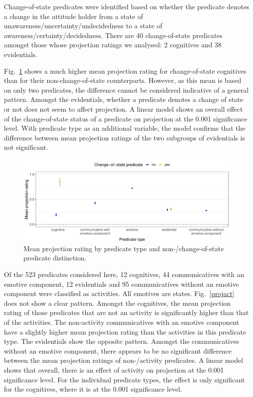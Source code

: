 \documentclass[11pt,fleqn]{article}
\newcommand{\figref}[1]{Fig.~\ref{#1}}
\newcommand{\6}{\mbox{$[\hspace*{-.6mm}[$}}
\newcommand{\9}{\mbox{$]\hspace*{-.6mm}]$}}
\begin{document}
Change-of-state predicates were identified based on whether the predicate denotes a change in the attitude holder from a state of unawareness/uncertainty/undecidedness to a state of awareness/certainty/decidedness. There are 40 change-of-state predicates amongst those whose projection ratings we analysed: 2 cognitives and 38 evidentials.

\figref{projcos} shows a much higher mean projection rating for change-of-state cognitives than for their non-change-of-state counterparts. However, as this mean is based on only two predicates, the difference cannot be considered indicative of a general pattern. Amongst the evidentials, whether a predicate denotes a change of state or not does not seem to affect projection. A linear model shows an overall effect of the change-of-state status of a predicate on projection at the 0.001 significance level. With predicate type as an additional variable, the model confirms that the difference between mean projection ratings of the two subgroups of evidentials is not significant.

\begin{figure}[H]
	\centering
	\includegraphics[width=1\textwidth]{projection-by-predicateType-and-CoS}
	\caption{Mean projection rating by predicate type and non-/change-of-state predicate distinction.}
	\label{projcos}
\end{figure}

Of the 523 predicates considered here, 12 cognitives, 44 communicatives with an emotive component, 12 evidentials and 95 communicatives without an emotive component were classified as activities. All emotives are states.
\figref{projact} does not show a clear pattern. Amongst the cognitives, the mean projection rating of those predicates that are not an activity is significantly higher than that of the activities. The non-activity communicatives with an emotive component have a slightly higher mean projection rating than the activities in this predicate type. The evidentials show the opposite pattern. Amongst the communicatives without an emotive component, there appears to be no significant difference between the mean projection ratings of non-/activity predicates. A linear model shows that overall, there is an effect of activity on projection at the 0.001 significance level. For the individual predicate types, the effect is only significant for the cognitives, where it is at the 0.001 significance level.
\end{document}
